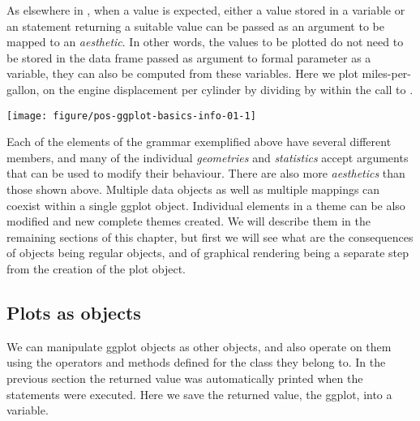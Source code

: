 \documentclass[krantz2]{krantz}\usepackage{knitr}%
\begin{document}
\begin{infobox}
As elsewhere in \Rlang, when a value is expected, either a value stored in a variable or an statement returning a suitable value can be passed as an argument to be mapped to an \emph{aesthetic}. In other words, the values to be plotted do not need to be stored in the data frame passed as argument to formal parameter  as a variable, they can also be computed from these variables. Here we plot miles-per-gallon,  on the engine displacement per cylinder by dividing  by  within the call to .

\begin{knitrout}\footnotesize
{}\color{fgcolor}\begin{kframe}
\begin{alltt}
\hlstd{(}  \hlstd{(}  \hlopt{/}    \hlopt{+}
  \hlstd{()}
\end{alltt}
\end{kframe}

{\centering \texttt{[image: figure/pos-ggplot-basics-info-01-1]} 

}



\end{knitrout}
\end{infobox}

Each of the elements of the grammar exemplified above have several different members, and many of the individual \emph{geometries} and \emph{statistics} accept arguments that can be used to modify their behaviour. There are also more \emph{aesthetics} than those shown above. Multiple data objects as well as multiple mappings can coexist within a single ggplot object.
Individual elements in a theme can be also modified and new complete themes created. We will describe them in the remaining sections of this chapter, but first we will see what are the consequences of  objects being regular \Rlang objects, and of graphical rendering being a separate step from the creation of the plot object.

\subsection{Plots as \Rlang objects}

We can manipulate ggplot objects as other \Rlang objects, and also operate on them using the operators and methods defined for the  class they belong to.
In the previous section the returned value was automatically printed when the statements were executed. Here we save the returned value, the ggplot, into a variable.
\end{document}

